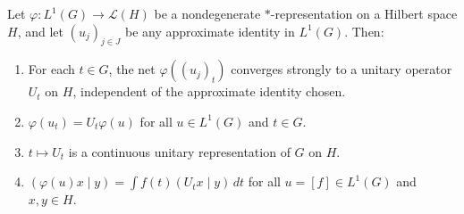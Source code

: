 \begin{theorem}
Let $\varphi: L^1(G) \to \mathcal{L}(H)$ be a nondegenerate $*$-representation on a Hilbert space $H$, and let $(u_j)_{j \in J}$ be any approximate identity in $L^1(G)$. Then:
\begin{enumerate}
\item[(1)] For each $t \in G$, the net $\varphi((u_j)_t)$ converges strongly to a unitary operator $U_t$ on $H$, independent of the approximate identity chosen.
\item[(2)] $\varphi(u_t) = U_t \varphi(u)$ for all $u \in L^1(G)$ and $t \in G$.
\item[(3)] $t \mapsto U_t$ is a continuous unitary representation of $G$ on $H$.
\item[(4)] $(\varphi(u)x \mid y) = \int f(t)(U_t x \mid y)\, dt$ for all $u = [f] \in L^1(G)$ and $x, y \in H$.
\end{enumerate}
\end{theorem}
